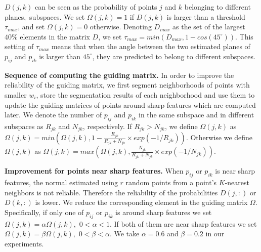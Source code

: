 $D(j,k)$ can be seen as the probability of
points $j$ and $k$ belonging to different planes,~\ie subspaces.
We set $\Omega(j,k) = 1$ if $D(j,k)$ is larger than a threshold $\tau_{max}$, and set $\Omega(j,k) = 0$ otherwise.
%
Denoting $D_{max}$ as the set of the largest $40\%$ elements in the
matrix $D$, we set $\tau_{max} = min(D_{max},1-cos(45^{\circ}))$.
This setting of $\tau_{max}$ means that when the angle between the two estimated planes of $p_{ij}$ and $p_{ik}$ is larger than $45^{\circ}$, they are predicted to belong to different subspaces.

\textbf{Sequence of computing the guiding matrix.}
In order to improve the reliability of the guiding matrix, we first segment neighborhoods of points with smaller $w_i$,
store the segmentation results of each neighborhood and use them to update the guiding matrices of points around sharp features which are computed later.
We denote the number of $p_{ij}$ and $p_{ik}$ in the same
subspace and in different subspaces as $R_{jk}$ and $N_{jk}$, respectively.
If $R_{jk}>N_{jk}$, we define $\Omega(j,k)$ as $\Omega(j,k) = min\left ( \Omega(j,k), 1- \frac{R_{jk}}{R_{jk}+N_{jk}}\times exp(-1/R_{jk}) \right )$.
Otherwise we define $\Omega(j,k)$ as $\Omega(j,k) =
max\left ( \Omega(j,k),\frac{N_{jk}}{R_{jk}+N_{jk}}\times exp(-1/N_{jk}) \right )$.

\textbf{Improvement for points near sharp features.}
When $p_{ij}$ or $p_{ik}$ is near sharp features, the normal estimated using $r$ random points from a point's $K$-nearest neighbors is not reliable.
Therefore the reliability of the probabilities $D(j,:)$ or $D(k,:)$ is lower.
We reduce the corresponding element in the guiding matrix $\Omega$.
Specifically, if only one of $p_{ij}$ or $p_{ik}$ is around sharp features we set $\Omega(j,k) = \alpha \Omega(j,k),$ $0<\alpha<1$.
If both of them are near sharp features we set $\Omega(j,k) = \beta \Omega(j,k),$ $0< \beta < \alpha$.
%
We take $\alpha = 0.6$ and $\beta = 0.2$ in our experiments.
%

